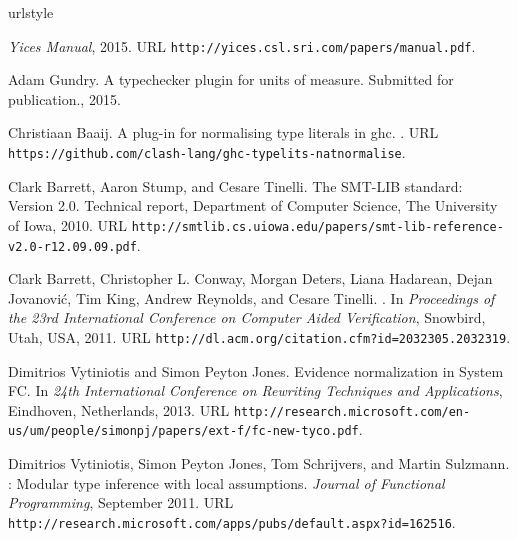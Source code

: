 \documentclass{sigplanconf}
\begin{document}
\begin{thebibliography}{}
\softraggedright

\providecommand{\natexlab}[1]{#1}
\providecommand{\url}[1]{\texttt{#1}}
\expandafter\ifx\csname urlstyle\endcsname\relax
  \providecommand{\doi}[1]{doi: #1}\else
  \providecommand{\doi}{doi: \begingroup \urlstyle{rm}\Url}\fi

\emph{Yices Manual}, 2015.
\newblock URL \url{http://yices.csl.sri.com/papers/manual.pdf}.

{Adam Gundry}.
\newblock A typechecker plugin for units of measure.
\newblock Submitted for publication., 2015.

{Christiaan Baaij}.
\newblock A plug-in for normalising type literals in ghc.
.
\newblock URL \url{https://github.com/clash-lang/ghc-typelits-natnormalise}.

{Clark Barrett}, {Aaron Stump}, and {Cesare Tinelli}.
\newblock The {SMT-LIB} standard: Version 2.0.
\newblock Technical report, Department of Computer Science, The University of
  Iowa, 2010.
\newblock URL
  \url{http://smtlib.cs.uiowa.edu/papers/smt-lib-reference-v2.0-r12.09.09.pdf}.

{Clark Barrett}, {Christopher L. Conway}, {Morgan Deters}, {Liana Hadarean},
  {Dejan Jovanovi\'{c}}, {Tim King}, {Andrew Reynolds}, and {Cesare Tinelli}.
.
\newblock In \emph{Proceedings of the 23rd International Conference on Computer
  Aided Verification}, Snowbird, Utah, USA, 2011.
\newblock URL \url{http://dl.acm.org/citation.cfm?id=2032305.2032319}.

{Dimitrios Vytiniotis} and {Simon Peyton Jones}.
\newblock Evidence normalization in System FC.
\newblock In \emph{24th International Conference on Rewriting Techniques and
  Applications}, Eindhoven, Netherlands, 2013.
\newblock URL
  \url{http://research.microsoft.com/en-us/um/people/simonpj/papers/ext-f/fc-new-tyco.pdf}.

{Dimitrios Vytiniotis}, {Simon Peyton Jones}, {Tom Schrijvers}, and {Martin
  Sulzmann}.
: Modular type inference with local assumptions.
\newblock \emph{Journal of Functional Programming}, September 2011.
\newblock URL
  \url{http://research.microsoft.com/apps/pubs/default.aspx?id=162516}.


\end{thebibliography}
\end{document}
